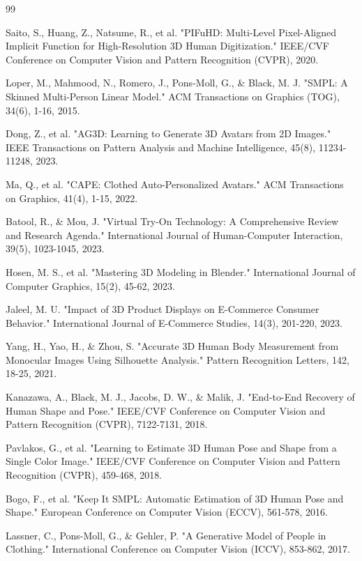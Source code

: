 \documentclass[12pt,a4paper,oneside]{report}
\begin{document}
\begin{thebibliography}{99}

 Saito, S., Huang, Z., Natsume, R., et al. "PIFuHD: Multi-Level Pixel-Aligned Implicit Function for High-Resolution 3D Human Digitization." IEEE/CVF Conference on Computer Vision and Pattern Recognition (CVPR), 2020.

 Loper, M., Mahmood, N., Romero, J., Pons-Moll, G., \& Black, M. J. "SMPL: A Skinned Multi-Person Linear Model." ACM Transactions on Graphics (TOG), 34(6), 1-16, 2015.

 Dong, Z., et al. "AG3D: Learning to Generate 3D Avatars from 2D Images." IEEE Transactions on Pattern Analysis and Machine Intelligence, 45(8), 11234-11248, 2023.

 Ma, Q., et al. "CAPE: Clothed Auto-Personalized Avatars." ACM Transactions on Graphics, 41(4), 1-15, 2022.

 Batool, R., \& Mou, J. "Virtual Try-On Technology: A Comprehensive Review and Research Agenda." International Journal of Human-Computer Interaction, 39(5), 1023-1045, 2023.

 Hosen, M. S., et al. "Mastering 3D Modeling in Blender." International Journal of Computer Graphics, 15(2), 45-62, 2023.

 Jaleel, M. U. "Impact of 3D Product Displays on E-Commerce Consumer Behavior." International Journal of E-Commerce Studies, 14(3), 201-220, 2023.

 Yang, H., Yao, H., \& Zhou, S. "Accurate 3D Human Body Measurement from Monocular Images Using Silhouette Analysis." Pattern Recognition Letters, 142, 18-25, 2021.

 Kanazawa, A., Black, M. J., Jacobs, D. W., \& Malik, J. "End-to-End Recovery of Human Shape and Pose." IEEE/CVF Conference on Computer Vision and Pattern Recognition (CVPR), 7122-7131, 2018.

 Pavlakos, G., et al. "Learning to Estimate 3D Human Pose and Shape from a Single Color Image." IEEE/CVF Conference on Computer Vision and Pattern Recognition (CVPR), 459-468, 2018.

 Bogo, F., et al. "Keep It SMPL: Automatic Estimation of 3D Human Pose and Shape." European Conference on Computer Vision (ECCV), 561-578, 2016.

 Lassner, C., Pons-Moll, G., \& Gehler, P. "A Generative Model of People in Clothing." International Conference on Computer Vision (ICCV), 853-862, 2017.


\end{thebibliography}
\end{document}
